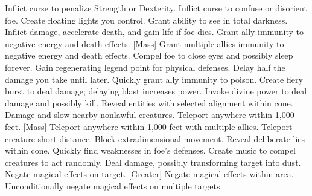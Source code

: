     {Inflict curse to penalize Strength or Dexterity.}
    {Inflict curse to confuse or disorient foe.}
    {Create floating lights you control.}
    {Grant ability to see in total darkness.}
    {Inflict damage, accelerate death, and gain life if foe dies.}
    {Grant ally immunity to negative energy and death effects.}
[Mass]
    {Grant multiple allies immunity to negative energy and death effects.}
    {Compel foe to close eyes and possibly sleep forever.}
    {Gain regenerating legend point for physical defenses.}
    {Delay half the damage you take until later.}
    {Quickly grant ally immunity to poison.}
    {Create fiery burst to deal damage; delaying blast increases power.}
    {Invoke divine power to deal damage and possibly kill.}
    {Reveal entities with selected alignment within cone.}
    {Damage and slow nearby nonlawful creatures.}
    {Teleport anywhere within 1,000 feet.}
[Mass]
    {Teleport anywhere within 1,000 feet with multiple allies.}
    {Teleport creature short distance.}
    {Block extradimensional movement.}
    {Reveal deliberate lies within cone.}
    {Quickly find weaknesses in foe's defenses.}
    {Create music to compel creatures to act randomly.}
    {Deal damage, possibly transforming target into dust.}
    {Negate magical effects on target.}
[Greater]
    {Negate magical effects within area.}
    {Unconditionally negate magical effects on multiple targets.}

